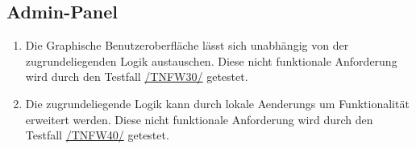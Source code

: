 \subsection*{Admin-Panel}

\begin{samepage}
    \begin{enumerate}[label=\textbf{/NFW\arabic*0/}, align=left, start=3]
        \item \label{/NFW30/} Die Graphische Benutzeroberfläche lässt sich unabhängig von der zugrundeliegenden Logik austauschen. Diese nicht funktionale Anforderung wird durch den Testfall \hyperref[/TNFW30/]{/TNFW30/} getestet.
        \item \label{/NFW40/} Die zugrundeliegende Logik kann durch \glspl{lokale Aenderung} um Funktionalität erweitert werden. Diese nicht funktionale Anforderung wird durch den Testfall \hyperref[/TNFW40/]{/TNFW40/} getestet.
    \end{enumerate}
\end{samepage}